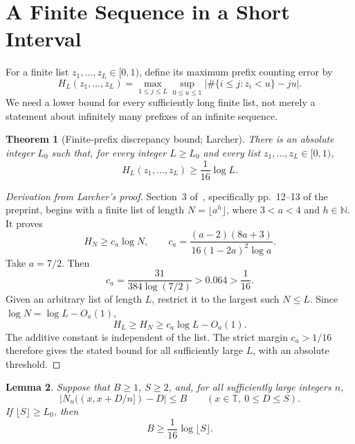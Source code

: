 \documentclass[11pt]{article}
\newtheorem{theorem}{Theorem}[section]
\newtheorem{lemma}[theorem]{Lemma}
\theoremstyle{remark}
\numberwithin{equation}{section}
\newcommand{\T}{\mathbb{T}}
\newcommand{\N}{\mathbb{N}}
\begin{document}
\section{A Finite Sequence in a Short Interval}
For a finite list $z_1,\ldots,z_L\in[0,1)$, define its maximum prefix
counting error by
\[
  H_L(z_1,\ldots,z_L)
  =\max_{1\leq j\leq L}\sup_{0\leq u\leq1}
   \left|\#\{i\leq j:z_i<u\}-ju\right|.
\]
We need a lower bound for every sufficiently long finite list, not merely
a statement about infinitely many prefixes of an infinite sequence.
\begin{theorem}[Finite-prefix discrepancy bound; Larcher]\label{thm:larcher}
There is an absolute integer $L_0$ such that, for every integer $L\geq L_0$
and every list $z_1,\ldots,z_L\in[0,1)$,
\[
  H_L(z_1,\ldots,z_L)\geq\frac1{16}\log L.
\]
\end{theorem}
\begin{proof}[Derivation from Larcher's proof]
Section~3 of~\cite{larcher}, specifically pp.~12--13 of the preprint,
begins with a finite list of length $N=\lfloor a^h\rfloor$, where
$3<a<4$ and $h\in\N$. It proves
\[
  H_N\geq c_a\log N,
  \qquad
  c_a=\frac{(a-2)(8a+3)}{16(1-2a)^2\log a}.
\]
Take $a=7/2$. Then
\[
  c_a=\frac{31}{384\log(7/2)}>0.064>\frac1{16}.
\]
Given an arbitrary list of length $L$, restrict it to the largest such
$N\leq L$. Since $\log N=\log L-O_a(1)$,
\[
  H_L\geq H_N\geq c_a\log L-O_a(1).
\]
The additive constant is independent of the list. The strict margin
$c_a>1/16$ therefore gives the stated bound for all sufficiently large
$L$, with an absolute threshold.
\end{proof}
\begin{lemma}\label{lem:finite-sequence}
Suppose that $B\geq1$, $S\geq2$, and, for all sufficiently large integers
$n$,
\begin{equation}\label{eq:count-hypothesis}
  \left|N_n((x,x+D/n])-D\right|\leq B
  \qquad(x\in\T,\ 0\leq D\leq S).
\end{equation}
If $\lfloor S\rfloor\geq L_0$, then
\[
  B\geq\frac1{16}\log\lfloor S\rfloor.
\]
\end{lemma}
\end{document}
